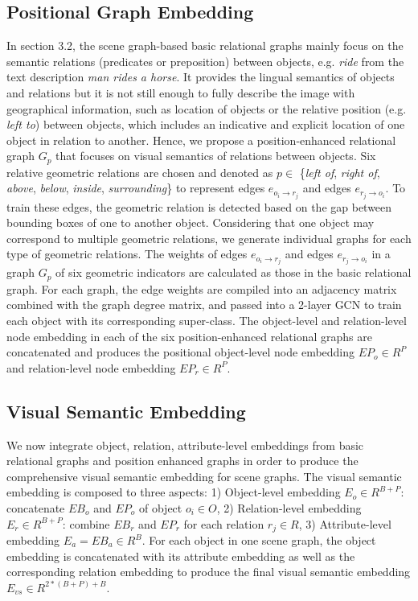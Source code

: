 \documentclass[11pt]{article}
\begin{document}
\subsection{Positional Graph Embedding}
In section 3.2, the scene graph-based basic relational graphs mainly focus on the semantic relations (predicates or preposition) between objects, e.g. \textit{ride} from the text description \textit{man rides a horse}. It provides the lingual semantics of objects and relations but it is not still enough to fully describe the image with geographical information, such as location of objects or the relative position (e.g. \textit{left to}) between objects, which includes an indicative and explicit location of one object in relation to another. Hence, we propose a position-enhanced relational graph $G_{p}$ that focuses on visual semantics of relations between objects. Six relative geometric relations are chosen and denoted as $p \in$  \{\textit{left of}, \textit{right of}, \textit{above}, \textit{below}, \textit{inside}, \textit{surrounding}\} to represent edges $e_{o_{i}\to r_{j}}$ and edges $e_{r_{j}\to o_{i}}$. To train these edges, the geometric relation is detected based on the gap between bounding boxes of one to another object. Considering that one object may correspond to multiple geometric relations, we generate individual graphs for each type of geometric relations. The weights of edges $e_{o_{i}\to r_{j}}$ and edges $e_{r_{j}\to o_{i}}$ in a graph $G_{p}$ of six geometric indicators are calculated as those in the basic relational graph. For each graph, the edge weights are compiled into an adjacency matrix combined with the graph degree matrix, and passed into a 2-layer GCN to train each object with its corresponding super-class. The object-level and relation-level node embedding in each of the six position-enhanced relational graphs are concatenated and produces the positional object-level node embedding $EP_{o}\in R^{P}$ and relation-level node embedding $EP_{r}\in R^{P}$.



\subsection{Visual Semantic Embedding} 
We now integrate object, relation, attribute-level embeddings from basic relational graphs and position enhanced graphs in order to produce the comprehensive visual semantic embedding for scene graphs. The visual semantic embedding is composed to three aspects: 1) Object-level embedding $E_{o}\in R^{B+P}$: concatenate $EB_{o}$ and $EP_{o}$ of object $o_{i}\in O$, 2) Relation-level embedding $E_{r}\in R^{B+P}$: combine $EB_{r}$ and $EP_{r}$ for each relation $r_{j}\in R$, 3) Attribute-level embedding $E_{a}=EB_{a}\in R^{B}$. For each object in one scene graph, the object embedding is concatenated with its attribute embedding as well as the corresponding relation embedding to produce the final visual semantic embedding $E_{vs}\in R^{2\ast \left ( B+P \right )+B}$.
\end{document}
